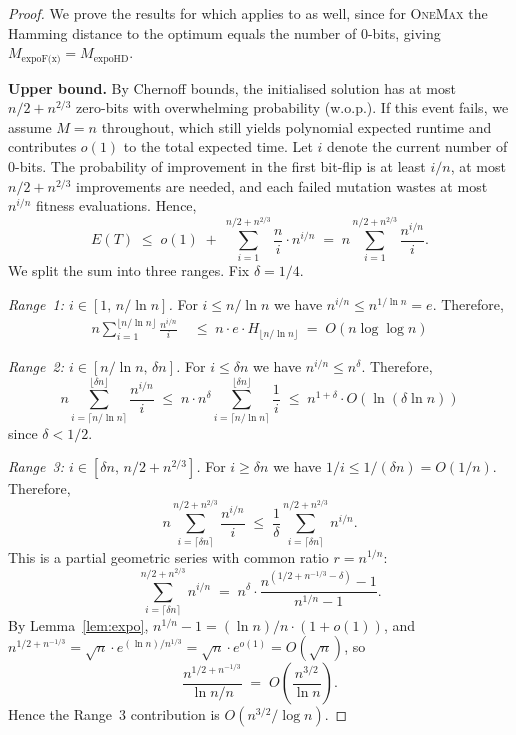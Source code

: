 \begin{proof}
We prove the results for \expoF{} which applies to \expoHD{} as well, since for \textsc{OneMax} the Hamming distance to the optimum equals the number of 0-bits, giving $M_{\text{expoF(x)}}=M_{\text{expoHD}}$.

\medskip
\noindent\textbf{Upper bound.}
By Chernoff bounds, the initialised solution has at most $n/2+n^{2/3}$ zero-bits with overwhelming probability (w.o.p.). If this event fails, we assume $M=n$ throughout, which still yields polynomial expected runtime and contributes $o(1)$ to the total expected time. Let $i$ denote the current number of 0-bits. The probability of improvement in the first bit-flip is at least $i/n$, at most $n/2+n^{2/3}$ improvements are needed, and each failed mutation wastes at most $n^{i/n}$ fitness evaluations. Hence,
\[
E(T) \;\leq\; o(1) \;+\; \sum_{i=1}^{n/2+n^{2/3}} \frac{n}{i}\cdot n^{i/n}
\;=\; n\sum_{i=1}^{n/2+n^{2/3}} \frac{n^{i/n}}{i}.
\]
We split the sum into three ranges. Fix $\delta=1/4$.

\emph{Range~1: $i\in[1,\,n/\ln n]$.}
For $i\leq n/\ln n$ we have $n^{i/n}\leq n^{1/\ln n}=e$.
Therefore,
\begin{align*}
n\sum_{i=1}^{\lfloor n/\ln n\rfloor}\frac{n^{i/n}}{i}
\;&\leq\; n\cdot e\cdot H_{\lfloor n/\ln n\rfloor}
\;=\; O(n\log\log n)
\end{align*}


\emph{Range~2: $i\in[n/\ln n,\,\delta n]$.}
For $i\leq \delta n$ we have $n^{i/n}\leq n^{\delta}$.
Therefore,
\[
n\sum_{i=\lceil n/\ln n\rceil}^{\lfloor\delta n\rfloor}\frac{n^{i/n}}{i}
\;\leq\; n\cdot n^{\delta}\sum_{i=\lceil n/\ln n\rceil}^{\lfloor\delta n\rfloor}\frac{1}{i}
\;\leq\; n^{1+\delta}\cdot O(\ln(\delta\ln n))
\]
since $\delta<1/2$.

\emph{Range~3: $i\in[\delta n,\,n/2+n^{2/3}]$.}
For $i\geq \delta n$ we have $1/i\leq 1/(\delta n)=O(1/n)$.
Therefore,
\[
n\sum_{i=\lceil\delta n\rceil}^{n/2+n^{2/3}}\frac{n^{i/n}}{i}
\;\leq\; \frac{1}{\delta}\sum_{i=\lceil\delta n\rceil}^{n/2+n^{2/3}} n^{i/n}.
\]
This is a partial geometric series with common ratio $r=n^{1/n}$:
\[
\sum_{i=\lceil\delta n\rceil}^{n/2+n^{2/3}} n^{i/n}
\;=\; n^{\delta}\cdot\frac{n^{(1/2+n^{-1/3}-\delta)}-1}{n^{1/n}-1}.
\]
By Lemma~\ref{lem:expo}, $n^{1/n}-1=(\ln n)/n\cdot(1+o(1))$, and $n^{1/2+n^{-1/3}}=\sqrt{n}\cdot e^{(\ln n)/n^{1/3}}=\sqrt{n}\cdot e^{o(1)}=O(\sqrt{n})$, so
\[
\frac{n^{1/2+n^{-1/3}}}{\ln n/n}
\;=\; O\!\left(\frac{n^{3/2}}{\ln n}\right).
\]
Hence the Range~3 contribution is $O(n^{3/2}/\log n)$.


\end{proof}
